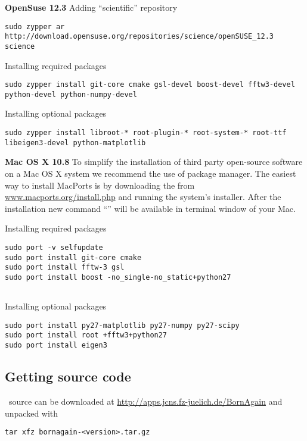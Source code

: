 \noindent
{\large\bf OpenSuse 12.3} \newline
Adding ``scientific'' repository 
\begin{lstlisting}[language=shell, style=commandline]
sudo zypper ar http://download.opensuse.org/repositories/science/openSUSE_12.3 science
\end{lstlisting}

\noindent
Installing required packages
\begin{lstlisting}[language=shell, style=commandline]
sudo zypper install git-core cmake gsl-devel boost-devel fftw3-devel python-devel python-numpy-devel
\end{lstlisting}

\noindent
Installing optional packages
\begin{lstlisting}[language=shell, style=commandline]
sudo zypper install libroot-* root-plugin-* root-system-* root-ttf libeigen3-devel python-matplotlib
\end{lstlisting}
\vspace*{3mm}



\noindent
\noindent
{\large\bf Mac OS X 10.8} \newline
To simplify the installation of third party open-source software on a Mac OS X system we recommend the use of  package manager. 
The easiest way to install MacPorts is by downloading the  
from \url{www.macports.org/install.php} and running the system's installer.
After the installation new command ``'' will be available in terminal window of your Mac. \

\noindent
Installing required packages
\begin{lstlisting}[language=shell, style=commandline]
sudo port -v selfupdate
sudo port install git-core cmake
sudo port install fftw-3 gsl
sudo port install boost -no_single-no_static+python27 


\end{lstlisting}

\noindent
Installing optional packages
\begin{lstlisting}[language=shell, style=commandline]
sudo port install py27-matplotlib py27-numpy py27-scipy
sudo port install root +fftw3+python27
sudo port install eigen3
\end{lstlisting}




\subsection{Getting source code}
\BornAgain\ source can be downloaded at \url{http://apps.jcns.fz-juelich.de/BornAgain}
and unpacked with
\begin{lstlisting}[language=shell, style=commandline]
tar xfz bornagain-<version>.tar.gz
\end{lstlisting}

